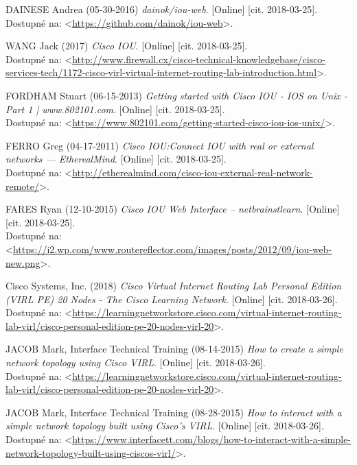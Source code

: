 \begin{thebibliography}{99}
DAINESE Andrea (05-30-2016) {\it dainok/iou-web}. [Online] [cit. 2018-03-25]. \\
Dostupné na: <\url{https://github.com/dainok/iou-web}>.

WANG Jack (2017) {\it Cisco IOU}. [Online] [cit. 2018-03-25]. \\
Dostupné na: <\url{http://www.firewall.cx/cisco-technical-knowledgebase/cisco-services-tech/1172-cisco-virl-virtual-internet-routing-lab-introduction.html}>.

FORDHAM Stuart (06-15-2013) {\it Getting started with Cisco IOU - IOS on Unix - Part 1 | www.802101.com}. [Online] [cit. 2018-03-25]. \\
Dostupné na: <\url{https://www.802101.com/getting-started-cisco-iou-ios-unix/}>.

FERRO Greg (04-17-2011) {\it Cisco IOU:Connect IOU with real or external networks — EtherealMind}. [Online] [cit. 2018-03-25]. \\
Dostupné na: <\url{http://etherealmind.com/cisco-iou-external-real-network-remote/}>.

FARES Ryan (12-10-2015) {\it Cisco IOU Web Interface – netbrainstlearn}. [Online] [cit. 2018-03-25]. \\
Dostupné na: <\url{https://i2.wp.com/www.routereflector.com/images/posts/2012/09/iou-web-new.png}>.

Cisco Systems, Inc. (2018) {\it Cisco Virtual Internet Routing Lab Personal Edition (VIRL PE) 20 Nodes - The Cisco Learning Network}. [Online] [cit. 2018-03-26]. \\
Dostupné na: <\url{https://learningnetworkstore.cisco.com/virtual-internet-routing-lab-virl/cisco-personal-edition-pe-20-nodes-virl-20}>.

JACOB Mark, Interface Technical Training (08-14-2015) {\it How to create a simple network topology using Cisco VIRL}. [Online] [cit. 2018-03-26]. \\
Dostupné na: <\url{https://learningnetworkstore.cisco.com/virtual-internet-routing-lab-virl/cisco-personal-edition-pe-20-nodes-virl-20}>.

JACOB Mark, Interface Technical Training (08-28-2015) {\it How to interact with a simple network topology built using Cisco’s VIRL}. [Online] [cit. 2018-03-26]. \\
Dostupné na: <\url{https://www.interfacett.com/blogs/how-to-interact-with-a-simple-network-topology-built-using-ciscos-virl/}>.


\end{thebibliography}
